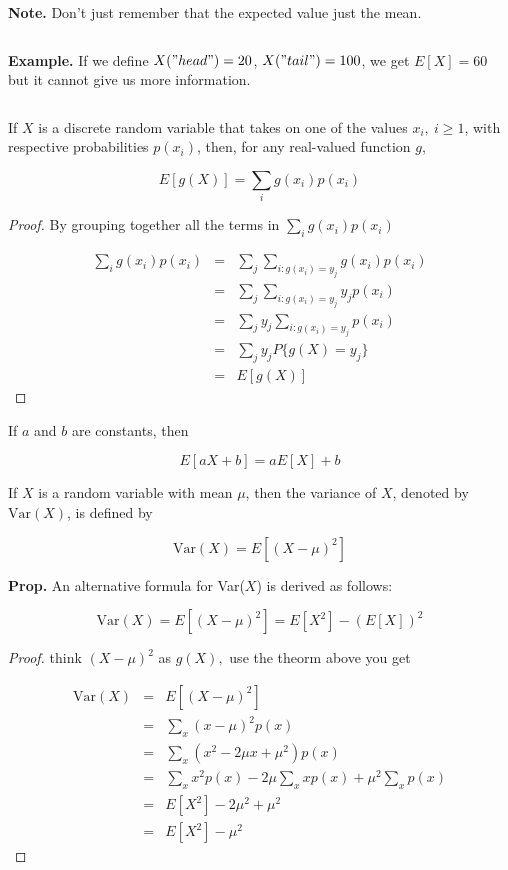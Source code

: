 \textbf{Note.} Don't just remember that the expected value just the mean.

$ $

\textbf{Example.} If we define $X("head") = 20$, $X("tail") = 100$, we get $E\left[X\right] =60$ but it cannot give us more information.

$ $

\begin{thm*}
	If $X$ is a discrete random variable that takes on one of the values $x_i,~i\geq 1$, with respective probabilities $p(x_i)$, then, for any real-valued function $g$,
	
	$$E[g(X)] = \sum_{i}g(x_i)p(x_i)$$
\end{thm*}

\newpage

\begin{proof}
	By grouping together all the terms in $\sum_ig(x_i)p(x_i)$
	
	\begin{eqnarray*}
		\sum_ig(x_i)p(x_i) &=& \sum_j \sum_{i:g(x_i)=y_j}g(x_i)p(x_i)\\
		&=& \sum_j\sum_{i:g(x_i)=y_j}y_jp(x_i)\\
		&=& \sum_jy_j\sum_{i:g(x_i)=y_j}p(x_i)\\
		&=&\sum_{j}y_jP\{g(X) = y_j\}\\
		&=& E[g(X)] 
	\end{eqnarray*}
\end{proof}

\begin{cor*}
	If $a$ and $b$ are constants, then 
	
	$$E[aX + b] = aE[X] + b$$
\end{cor*}

\begin{defn}
	If $X$ is a random variable with mean $\mu$, then the variance of $X$, denoted by $\text{Var}(X)$, is defined by
	
	$$\text{Var}(X) = E[(X - \mu)^2]$$
\end{defn}

\textbf{Prop.} An alternative formula for Var($X$) is derived as follows:

$$\text{Var}(X) = E[(X - \mu)^2] = E[X^2] - (E[X])^2$$

\begin{proof}
	think $(X - \mu)^2$ as $g(X),$ use the theorm above you get
	
	\begin{eqnarray*}
		\text{Var}(X) &=& E[(X - \mu)^2]\\
		&=& \sum_x(x - \mu)^2p(x)\\
		&=& \sum_x(x^2 - 2\mu x + \mu^2)p(x)\\
		&=&\sum_x x^2p(x) - 2\mu \sum_x xp(x) + \mu^2\sum_x p(x)\\
		&=& E[X^2] - 2\mu^2 + \mu^2\\
		&=& E[X^2] - \mu^2
	\end{eqnarray*}
\end{proof}

